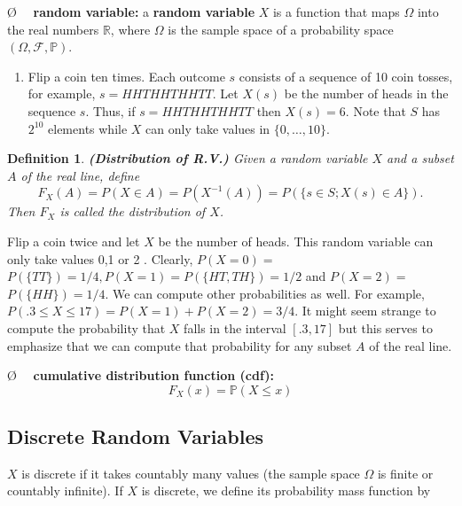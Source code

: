 \documentclass[13pt]{article}
\newtheorem{definition}[theorem]{Definition}
\theoremstyle{definition}
\theoremstyle{remark}
\newenvironment{remark}
  {\pushQED{\qed}\renewcommand{\qedsymbol}{$\triangle$}\remarkx}
  {\popQED\endremarkx}
\newenvironment{point}
  {\O~~}
  {}
\newcommand{\PP}{\mathbb{P}}
\begin{document}
\begin{point}
    \textbf{random variable:} a \textbf{random variable} $X$ is a function that maps $\Omega$ into the real numbers $\mathbb{R}$, where $\Omega$ is the sample space of a probability space $(\Omega,\mathcal{F},\PP)$.

\end{point}

\begin{remark}\hfill
    \begin{enumerate}
        \item Flip a coin ten times. Each outcome $s$ consists of a sequence of 10 coin tosses, for example, $s=H H T H H T H H T T$. Let $X(s)$ be the number of heads in the sequence $s$. Thus, if $s=HHTHHTHHTT$ then $X(s)=6$. Note that $S$ has $2^{10}$ elements while $X$ can only take values in $\{0, \ldots, 10\}$.

    \end{enumerate}
\end{remark}

\begin{definition}\textbf{(Distribution of R.V.)}
Given a random variable $X$ and a subset $A$ of the real line, define
\[
F_{X}(A)=P(X \in A)=P\left(X^{-1}(A)\right)=P(\{s \in S ; X(s) \in A\}) .
\]
Then $F_{X}$ is called the distribution of $X$.
\end{definition}
\begin{remark}Flip a coin twice and let $X$ be the number of heads. This random variable can only take values 0,1 or 2 . Clearly, $P(X=0)=$ $P(\{T T\})=1 / 4, P(X=1)=P(\{H T, T H\})=1 / 2$ and $P(X=2)=$ $P(\{H H\})=1 / 4$. We can compute other probabilities as well. For example, $P(.3 \leq X \leq 17)=P(X=1)+P(X=2)=3 / 4$. It might seem strange to compute the probability that $X$ falls in the interval $[.3,17]$ but this serves to emphasize that we can compute that probability for any subset $A$ of the real line.
\end{remark}

\begin{point}
    \textbf{cumulative distribution function (cdf):} 
    \[F_X(x)=\PP(X\leq x)\]

\end{point}

\subsection{Discrete Random Variables}
$X$ is discrete if it takes countably many values (the sample space $\Omega$ is finite or countably infinite). If $X$ is discrete, we define its probability mass function by
\end{document}
